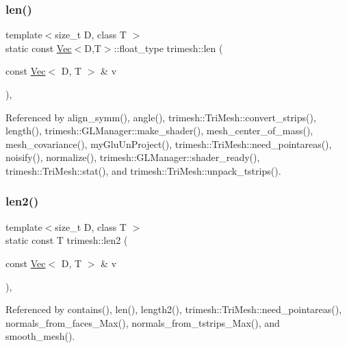 \mbox{\label{namespacetrimesh_aacbb6d9ec580813cc08ba3c996297b23}} 
\subsubsection{\texorpdfstring{len()}{len()}}
{\footnotesize\ttfamily template$<$size\+\_\+t D, class T $>$ \\
static const \hyperlink{classtrimesh_1_1Vec}{Vec}$<$D,T$>$\+::float\+\_\+type trimesh\+::len (\begin{DoxyParamCaption}\item[{const \hyperlink{classtrimesh_1_1Vec}{Vec}$<$ D, T $>$ \&}]{v }\end{DoxyParamCaption})\hspace{0.3cm}{\ttfamily [inline]}, {\ttfamily [static]}}



Referenced by align\+\_\+symm(), angle(), trimesh\+::\+Tri\+Mesh\+::convert\+\_\+strips(), length(), trimesh\+::\+G\+L\+Manager\+::make\+\_\+shader(), mesh\+\_\+center\+\_\+of\+\_\+mass(), mesh\+\_\+covariance(), my\+Glu\+Un\+Project(), trimesh\+::\+Tri\+Mesh\+::need\+\_\+pointareas(), noisify(), normalize(), trimesh\+::\+G\+L\+Manager\+::shader\+\_\+ready(), trimesh\+::\+Tri\+Mesh\+::stat(), and trimesh\+::\+Tri\+Mesh\+::unpack\+\_\+tstrips().

\mbox{\label{namespacetrimesh_a9a2f1fb61e316b55feecfb0aac5173d7}} 
\subsubsection{\texorpdfstring{len2()}{len2()}}
{\footnotesize\ttfamily template$<$size\+\_\+t D, class T $>$ \\
static const T trimesh\+::len2 (\begin{DoxyParamCaption}\item[{const \hyperlink{classtrimesh_1_1Vec}{Vec}$<$ D, T $>$ \&}]{v }\end{DoxyParamCaption})\hspace{0.3cm}{\ttfamily [inline]}, {\ttfamily [static]}}



Referenced by contains(), len(), length2(), trimesh\+::\+Tri\+Mesh\+::need\+\_\+pointareas(), normals\+\_\+from\+\_\+faces\+\_\+\+Max(), normals\+\_\+from\+\_\+tstrips\+\_\+\+Max(), and smooth\+\_\+mesh().

